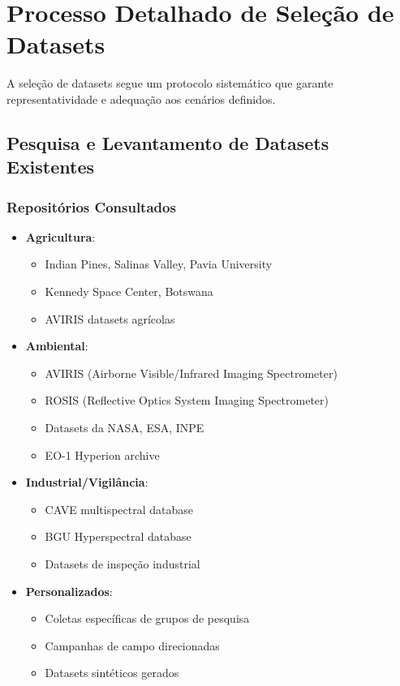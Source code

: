 \section{Processo Detalhado de Seleção de Datasets}\label{sec:selecao_datasets}

A seleção de datasets segue um protocolo sistemático que garante representatividade e adequação aos cenários definidos.

\subsection{Pesquisa e Levantamento de Datasets Existentes}

\subsubsection{Repositórios Consultados}
\begin{itemize}
    \item \textbf{Agricultura}: 
    \begin{itemize}
        \item Indian Pines, Salinas Valley, Pavia University
        \item Kennedy Space Center, Botswana
        \item AVIRIS datasets agrícolas
    \end{itemize}
    
    \item \textbf{Ambiental}:
    \begin{itemize}
        \item AVIRIS (Airborne Visible/Infrared Imaging Spectrometer)
        \item ROSIS (Reflective Optics System Imaging Spectrometer)
        \item Datasets da NASA, ESA, INPE
        \item EO-1 Hyperion archive
    \end{itemize}
    
    \item \textbf{Industrial/Vigilância}:
    \begin{itemize}
        \item CAVE multispectral database
        \item BGU Hyperspectral database
        \item Datasets de inspeção industrial
    \end{itemize}
    
    \item \textbf{Personalizados}:
    \begin{itemize}
        \item Coletas específicas de grupos de pesquisa
        \item Campanhas de campo direcionadas
        \item Datasets sintéticos gerados
    \end{itemize}
\end{itemize}

